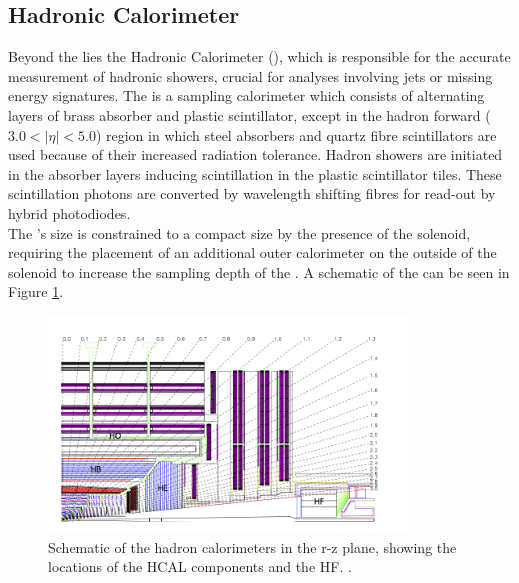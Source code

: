 \subsection{Hadronic Calorimeter}
\label{subsec:hcal} 

Beyond the \ECAL lies the Hadronic Calorimeter (\HCAL), which is responsible for the accurate measurement of hadronic showers, crucial for analyses involving jets or missing energy signatures. The \HCAL is a sampling calorimeter which consists of alternating layers of brass absorber and plastic scintillator, except in the hadron forward ($3.0 < \lvert\eta\rvert < 5.0 $) region in which steel absorbers and quartz fibre scintillators are used because of their increased radiation tolerance. Hadron showers are initiated in the absorber layers inducing scintillation in the plastic scintillator tiles.  These scintillation photons are converted by wavelength shifting fibres for read-out by hybrid photodiodes. \\

The \HCAL's size is constrained to a compact size by the presence of the solenoid, requiring the placement of an additional outer calorimeter on the outside of the solenoid to increase the sampling depth of the \HCAL. A schematic of the \HCAL can be seen in Figure \ref{fig:cms-hcal}.\\
 
 \begin{figure}[!h]

\centering
\includegraphics[width=0.85\textwidth]{plots/cms-hcal.png}
\caption[Schematic of the hadron calorimeters in the r-z plane, showing the locations of the HCAL components and the HF]{ Schematic of the hadron calorimeters in the r-z plane, showing the locations of the HCAL components and the HF. \cite{cmstdr}.}  
\label{fig:cms-hcal}
\end{figure}
 
